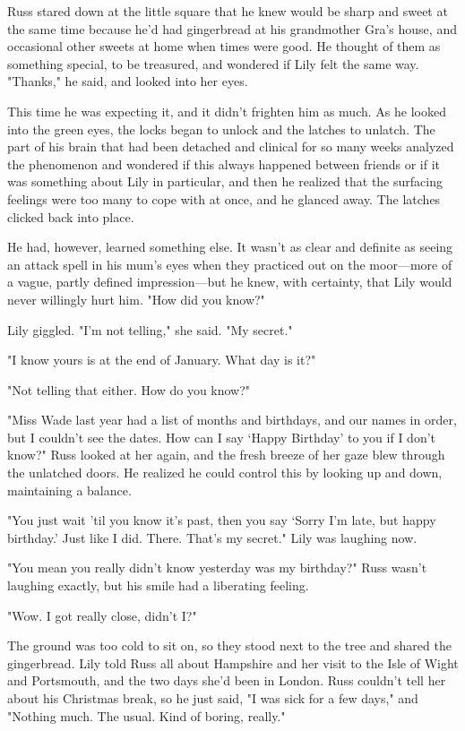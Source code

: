 Russ stared down at the little square that he knew would be sharp and sweet at the same time because he'd had gingerbread at his grandmother Gra's house, and occasional other sweets at home when times were good. He thought of them as something special, to be treasured, and wondered if Lily felt the same way. "Thanks," he said, and looked into her eyes.

This time he was expecting it, and it didn't frighten him as much. As he looked into the green eyes, the locks began to unlock and the latches to unlatch. The part of his brain that had been detached and clinical for so many weeks analyzed the phenomenon and wondered if this always happened between friends or if it was something about Lily in particular, and then he realized that the surfacing feelings were too many to cope with at once, and he glanced away. The latches clicked back into place.

He had, however, learned something else. It wasn't as clear and definite as seeing an attack spell in his mum's eyes when they practiced out on the moor—more of a vague, partly defined impression—but he knew, with certainty, that Lily would never willingly hurt him. "How did you{\el} know?"

Lily giggled. "I'm not telling," she said. "My secret."

"I know yours is at the end of{\el} January. What day is it?"

"Not telling that either. How do you know?"

"Miss Wade last year had a list of months and{\el} birthdays, and our names in order, but I couldn't see the{\el} dates. How can I say `Happy Birthday' to you if I don't{\el} know?" Russ looked at her again, and the fresh breeze of her gaze blew through the unlatched doors. He realized he could control this by looking up and down, maintaining a balance.

"You just wait 'til you know it's past, then you say `Sorry I'm late, but happy birthday.' Just like I did. There. That's my secret." Lily was laughing now.

"You mean you really didn't know{\el} yesterday was my birthday?" Russ wasn't laughing exactly, but his smile had a liberating feeling.

"Wow. I got really close, didn't I?"

The ground was too cold to sit on, so they stood next to the tree and shared the gingerbread. Lily told Russ all about Hampshire and her visit to the Isle of Wight and Portsmouth, and the two days she'd been in London. Russ couldn't tell her about his Christmas break, so he just said, "I was sick for a few days," and "Nothing much. The usual. Kind of boring, really."


